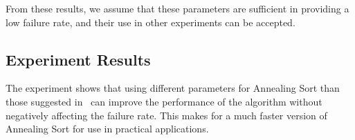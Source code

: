 From these results, we assume that these parameters are sufficient in providing a low failure rate, and their use in other experiments can be accepted.

\subsection{Experiment Results}

The experiment shows that using different parameters for Annealing Sort than those suggested in~ can improve the performance of the algorithm without negatively affecting the failure rate. 
This makes for a much faster version of Annealing Sort for use in practical applications.